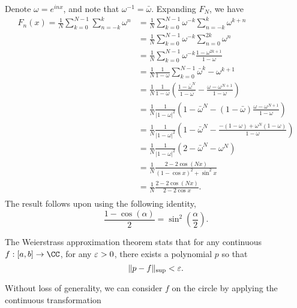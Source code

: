 \documentclass{homework}
\begin{document}

\begin{solution}
  Denote $\omega = e^{inx}$, and note that $\omega^{-1} = \bar \omega$. Expanding $F_N$, we have
\begin{align*}
  F_n(x) = \frac 1N \sum_{k=0}^{N-1} \sum_{n=-k}^k \omega^n
  &= \frac 1N \sum_{k=0}^{N-1} \omega^{-k} \sum_{n=-k}^k \omega^{k+n}\\
  &= \frac 1N \sum_{k=0}^{N-1} \omega^{-k} \sum_{n=0}^{2k} \omega^{n}\\
  &= \frac 1N \sum_{k=0}^{N-1} \omega^{-k}\frac{1 - \omega^{2k+1}}{1-\omega}\\
  &= \frac 1N \frac1{1-\omega} \sum_{k=0}^{N-1} \bar \omega^{k} - \omega^{k+1}\\
  &= \frac 1N \frac1{1-\omega} \left(\frac{1 - \bar \omega^{N}}{1-\bar \omega} - \frac{\omega - \omega^{N+1}}{1-\omega}\right)\\
  &= \frac 1N \frac1{|1-\omega|^2} \left(1 - \bar \omega^{N} - (1-\bar \omega)\frac{\omega - \omega^{N+1}}{1-\omega}\right)\\
  &= \frac 1N \frac1{|1-\omega|^2} \left(1 - \bar \omega^{N} - \frac{-(1-\omega) + \omega^N(1-\omega)}{1-\omega}\right)\\
  &= \frac 1N \frac1{|1-\omega|^2} \left(2 - \bar \omega^{N} - \omega^N\right)\\
  &= \frac 1N \frac{2 - 2\cos(Nx)}{(1-\cos x)^2 + \sin^2 x}\\
  &= \frac 1N \frac{2 - 2\cos(Nx)}{2-2\cos x}.\\
\end{align*}
The result follows upon using the following identity,
$$
  \frac{1 - \cos(\alpha)}{2} =\sin^2\left(\frac\alpha2\right).
$$
\end{solution}


\begin{solution}
The Weierstrass approximation theorem stats that for any continuous $f:[a,b] \to \CC$, for any $\varepsilon >0$, there exists a polynomial $p$ so that 
$$
  \|p - f\|_{\sup} < \varepsilon.
$$

Without loss of generality, we can consider $f$ on the circle by applying the continuous transformation 
\end{solution}
\end{document}

